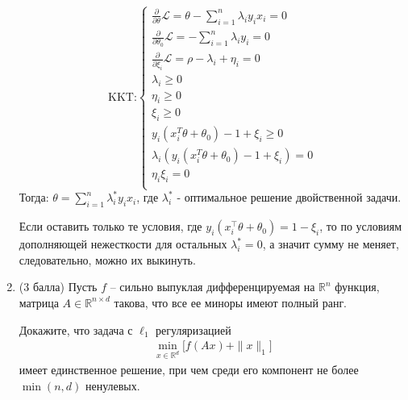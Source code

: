 \documentclass[a5paper,twoside,russian]{article}
\begin{document}
\begin{enumerate}[label=\textbf{Задача \arabic*.}]
\begin{prf}
            \[
                \text{KKT:}
                \left\{\!
                \begin{array}{l}
                    \frac{\partial}{\partial \theta} \mathcal{L} = \theta - \sum\limits_{i=1}^{n} \lambda_i y_i x_i = 0 \\
                    \frac{\partial}{\partial \theta_0} \mathcal{L} = -\sum\limits_{i=1}^{n} \lambda_i y_i = 0           \\
                    \frac{\partial}{\partial \xi_i} \mathcal{L} = \rho - \lambda_i + \eta_i = 0                         \\
                    \lambda_i \geq 0                                                                                    \\
                    \eta_i \geq 0                                                                                       \\
                    \xi_i \geq 0                                                                                        \\
                    y_i \left( x_i^T \theta + \theta_0 \right) - 1 + \xi_i \geq 0                                       \\
                    \lambda_i \left( y_i \left( x_i^T \theta + \theta_0 \right) - 1 + \xi_i \right) = 0                 \\
                    \eta_i\xi_i = 0                                                                                     \\
                \end{array}
                \!\right.
            \]
            Тогда: $ \theta = \sum\limits_{i=1}^{n} \lambda_i^* y_i x_i$, где $\lambda_i^*$ - оптимальное решение двойственной задачи.

            Если оставить только те условия, где $y_i(x_i^\top \theta + \theta_0) = 1 - \xi_i$, то по условиям дополняющей нежесткости
            для остальных $\lambda_i^* = 0$, а значит сумму не меняет, следовательно, можно их выкинуть.
        \end{prf}

        \item (3 балла) Пусть $f$ -- сильно выпуклая дифференцируемая на $\mathbb{R}^n$ функция,
        матрица $A \in \mathbb{R}^{n \times d}$ такова, что все ее миноры имеют полный ранг.


        Докажите, что задача с $\ell_1$ регуляризацией
        \begin{align*}
            \min_{x \in \mathbb{R}^d} \bigg[f(Ax) + \|x\|_1\bigg]
        \end{align*}
        имеет единственное решение, при чем среди его компонент не более $\min(n, d)$ ненулевых.


\end{enumerate}
\end{document}

